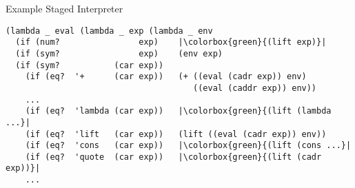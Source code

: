 \documentclass{beamer}
\begin{document}
\begin{frame}[fragile]{Example Staged Interpreter}
    \begin{verbatim}
(lambda _ eval (lambda _ exp (lambda _ env
  (if (num?                exp)    |\colorbox{green}{(lift exp)}|
  (if (sym?                exp)    (env exp)
  (if (sym?           (car exp))
    (if (eq?  '+      (car exp))   (+ ((eval (cadr exp)) env)
                                      ((eval (caddr exp)) env))
    ...
    (if (eq?  'lambda (car exp))   |\colorbox{green}{(lift (lambda ...}|
    (if (eq?  'lift   (car exp))   (lift ((eval (cadr exp)) env))
    (if (eq?  'cons   (car exp))   |\colorbox{green}{(lift (cons ...}|
    (if (eq?  'quote  (car exp))   |\colorbox{green}{(lift (cadr exp))}|
    ...
    \end{verbatim}
\end{frame}
\end{document}
